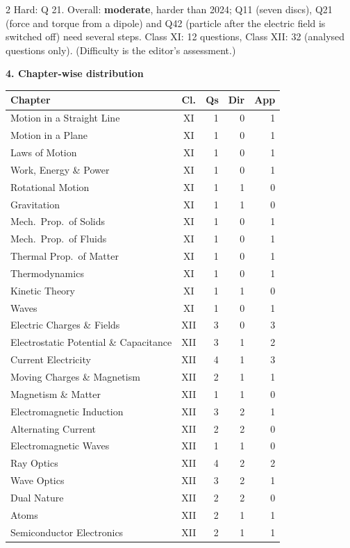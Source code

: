 \begin{multicols}{2}
{\footnotesize Hard: Q 21. Overall: \textbf{moderate}, harder than 2024; Q11 (seven discs), Q21 (force and torque from a dipole) and Q42 (particle after the electric field is switched off) need several steps. Class XI: 12 questions, Class XII: 32 (analysed questions only). (Difficulty is the editor's assessment.)}\par\medskip
\columnbreak
\textbf{\color{crimson}4. Chapter-wise distribution}\par\smallskip
{\footnotesize\begin{tabular}{@{}p{4.7cm}c@{\,}r@{\,}r@{\,}r@{}}\toprule
Chapter & Cl. & Qs & Dir & App\\\midrule
Motion in a Straight Line & XI & 1 & 0 & 1\\
Motion in a Plane & XI & 1 & 0 & 1\\
Laws of Motion & XI & 1 & 0 & 1\\
Work, Energy \& Power & XI & 1 & 0 & 1\\
Rotational Motion & XI & 1 & 1 & 0\\
Gravitation & XI & 1 & 1 & 0\\
Mech.\ Prop.\ of Solids & XI & 1 & 0 & 1\\
Mech.\ Prop.\ of Fluids & XI & 1 & 0 & 1\\
Thermal Prop.\ of Matter & XI & 1 & 0 & 1\\
Thermodynamics & XI & 1 & 0 & 1\\
Kinetic Theory & XI & 1 & 1 & 0\\
Waves & XI & 1 & 0 & 1\\
Electric Charges \& Fields & XII & 3 & 0 & 3\\
Electrostatic Potential \& Capacitance & XII & 3 & 1 & 2\\
Current Electricity & XII & 4 & 1 & 3\\
Moving Charges \& Magnetism & XII & 2 & 1 & 1\\
Magnetism \& Matter & XII & 1 & 1 & 0\\
Electromagnetic Induction & XII & 3 & 2 & 1\\
Alternating Current & XII & 2 & 2 & 0\\
Electromagnetic Waves & XII & 1 & 1 & 0\\
Ray Optics & XII & 4 & 2 & 2\\
Wave Optics & XII & 3 & 2 & 1\\
Dual Nature & XII & 2 & 2 & 0\\
Atoms & XII & 2 & 1 & 1\\
Semiconductor Electronics & XII & 2 & 1 & 1\\

\end{tabular}}
\end{multicols}
